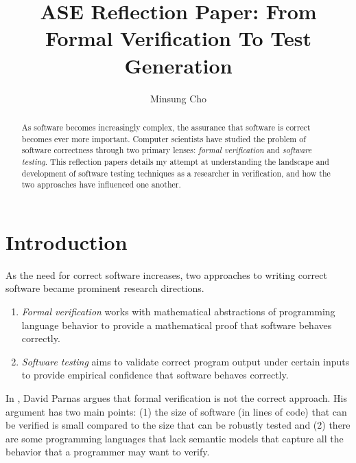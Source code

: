\documentclass[acmsmall,review, nonacm]{acmart}
\begin{document}
\title{ASE Reflection Paper: From Formal Verification To Test Generation} 

\author{Minsung Cho}

\begin{abstract}
    As software becomes increasingly complex, the assurance that software is correct becomes ever more important. Computer scientists have studied the problem of software correctness through two primary lenses: \textit{formal verification} and \textit{software testing}. This reflection papers details my attempt at understanding the landscape and development of software testing techniques as a researcher in verification, and how the two approaches have influenced one another.
\end{abstract}

\maketitle

\section{Introduction}

As the need for correct software increases, two approaches to writing correct software became prominent research directions.
\begin{enumerate}
  \item \textit{Formal verification} works with mathematical abstractions of programming language behavior to provide a mathematical proof that software behaves correctly. 
  \item \textit{Software testing} aims to validate correct program output under certain inputs to provide empirical confidence that software behaves correctly.
\end{enumerate}

In \cite{parnas1985defense}, David Parnas argues that formal verification is not the correct approach. His argument has two main points: (1) the size of software (in lines of code) that can be verified is small compared to the size that can be robustly tested  and (2) there are some programming languages that lack semantic models that capture all the behavior that a programmer may want to verify.
\end{document}
